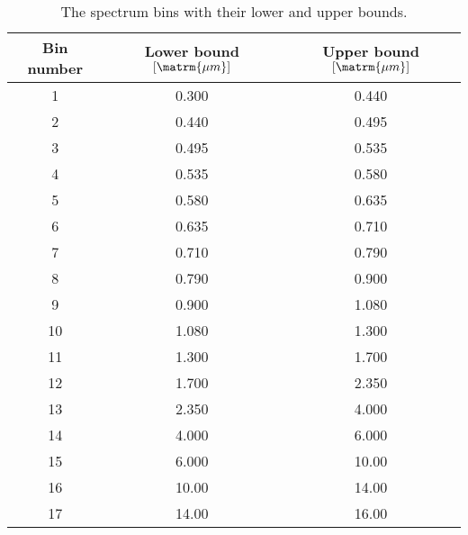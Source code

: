 \begin{table}[!htb]
\centering
\caption{The spectrum bins with their lower and upper bounds.}
\label{table:spectrum_bins_ranges}
\begin{tabular}{|c|c|c|}
\hline
\textbf{Bin number} & \textbf{Lower bound} $[\matrm{\mu m}]$ & \textbf{Upper bound} $[\matrm{\mu m}]$ \\ \hline
1                   & 0.300                  & 0.440                 \\ \hline
2                   & 0.440                 & 0.495                \\ \hline
3                   & 0.495                & 0.535                \\ \hline
4                   & 0.535                & 0.580                 \\ \hline
5                   & 0.580                 & 0.635                \\ \hline
6                   & 0.635                & 0.710                 \\ \hline
7                   & 0.710                 & 0.790                 \\ \hline
8                   & 0.790                 & 0.900                  \\ \hline
9                   & 0.900                  & 1.080                 \\ \hline
10                  & 1.080                 & 1.300                  \\ \hline
11                  & 1.300                  & 1.700                  \\ \hline
12                  & 1.700                  & 2.350                 \\ \hline
13                  & 2.350                 & 4.000                    \\ \hline
14                  & 4.000                    & 6.000                    \\ \hline
15                  & 6.000                    & 10.00                   \\ \hline
16                  & 10.00                   & 14.00                   \\ \hline
17                  & 14.00                   & 16.00                   \\ \hline
\end{tabular}
\end{table}




